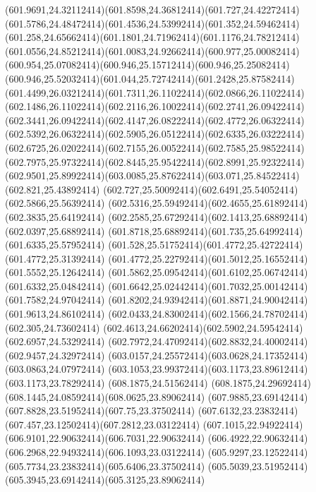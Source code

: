 {{	\curveto(601.9691,24.32112414)(601.8598,24.36812414)(601.727,24.42272414)
	\curveto(601.5786,24.48472414)(601.4536,24.53992414)(601.352,24.59462414)
	\curveto(601.258,24.65662414)(601.1801,24.71962414)(601.1176,24.78212414)
	\curveto(601.0556,24.85212414)(601.0083,24.92662414)(600.977,25.00082414)
	\curveto(600.954,25.07082414)(600.946,25.15712414)(600.946,25.25082414)
	\curveto(600.946,25.52032414)(601.044,25.72742414)(601.2428,25.87582414)
	\curveto(601.4499,26.03212414)(601.7311,26.11022414)(602.0866,26.11022414)
	\curveto(602.1486,26.11022414)(602.2116,26.10022414)(602.2741,26.09422414)
	\curveto(602.3441,26.09422414)(602.4147,26.08222414)(602.4772,26.06322414)
	\curveto(602.5392,26.06322414)(602.5905,26.05122414)(602.6335,26.03222414)
	\curveto(602.6725,26.02022414)(602.7155,26.00522414)(602.7585,25.98522414)
	\curveto(602.7975,25.97322414)(602.8445,25.95422414)(602.8991,25.92322414)
	\curveto(602.9501,25.89922414)(603.0085,25.87622414)(603.071,25.84522414)
	\lineto(602.821,25.43892414)
	\curveto(602.727,25.50092414)(602.6491,25.54052414)(602.5866,25.56392414)
	\curveto(602.5316,25.59492414)(602.4655,25.61892414)(602.3835,25.64192414)
	\curveto(602.2585,25.67292414)(602.1413,25.68892414)(602.0397,25.68892414)
	\curveto(601.8718,25.68892414)(601.735,25.64992414)(601.6335,25.57952414)
	\curveto(601.528,25.51752414)(601.4772,25.42722414)(601.4772,25.31392414)
	\curveto(601.4772,25.22792414)(601.5012,25.16552414)(601.5552,25.12642414)
	\curveto(601.5862,25.09542414)(601.6102,25.06742414)(601.6332,25.04842414)
	\curveto(601.6642,25.02442414)(601.7032,25.00142414)(601.7582,24.97042414)
	\curveto(601.8202,24.93942414)(601.8871,24.90042414)(601.9613,24.86102414)
	\curveto(602.0433,24.83002414)(602.1566,24.78702414)(602.305,24.73602414)
	\curveto(602.4613,24.66202414)(602.5902,24.59542414)(602.6957,24.53292414)
	\curveto(602.7972,24.47092414)(602.8832,24.40002414)(602.9457,24.32972414)
	\curveto(603.0157,24.25572414)(603.0628,24.17352414)(603.0863,24.07972414)
	\curveto(603.1053,23.99372414)(603.1173,23.89612414)(603.1173,23.78292414)
	\closepath
	\moveto(608.1875,24.51562414)
	\curveto(608.1875,24.29692414)(608.1445,24.08592414)(608.0625,23.89062414)
	\curveto(607.9885,23.69142414)(607.8828,23.51952414)(607.75,23.37502414)
	\curveto(607.6132,23.23832414)(607.457,23.12502414)(607.2812,23.03122414)
	\curveto(607.1015,22.94922414)(606.9101,22.90632414)(606.7031,22.90632414)
	\curveto(606.4922,22.90632414)(606.2968,22.94932414)(606.1093,23.03122414)
	\curveto(605.9297,23.12522414)(605.7734,23.23832414)(605.6406,23.37502414)
	\curveto(605.5039,23.51952414)(605.3945,23.69142414)(605.3125,23.89062414)
}}
